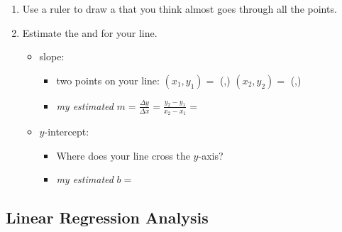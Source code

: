 \documentclass[12pt,letterpaper]{memoir}
\begin{document}
\begin{enumerate}[fullwidth,label={\Large$\bm{\square}$}\,\arabic*.,resume]
\begin{tcbraster}[
            raster equal height, raster columns = 3,
            raster left skip = 0.3in, raster right skip = 0.3in, raster column skip = 0.2in,
            colback=white, valign=center,
        ]
\begin{tcolorbox}
\begin{tikzpicture}[scale=0.25]
                \end{tikzpicture}\\
            \end{tcolorbox}
        \end{tcbraster}
    \item Use a ruler to draw a  that you think almost goes through all the points.
    \item Estimate the  and  for your line.
        \begin{itemize}
            \item slope:
                \begin{itemize}
                    \item two points on your line: 
                        $(x_1,y_1) = $ (\underline{\hspace{4em}},\underline{\hspace{4em}})
                        $(x_2,y_2) = $ (\underline{\hspace{4em}},\underline{\hspace{4em}})
                    \item {\itshape my estimated} 
                        $m = \frac{\Delta y}{\Delta x} = \frac{y_2 - y_1}{x_2 - x_1} =$ 
                        \underline{\hspace{3in}}
                \end{itemize}
            \item $y$-intercept:
                \begin{itemize}
                    \item Where does your line cross the $y$-axis?
                    \item {\itshape my estimated} $b =$ \underline{\hspace{1in}}
                \end{itemize}
        \end{itemize}
\end{enumerate}

\subsection*{Linear Regression Analysis}
\end{document}
